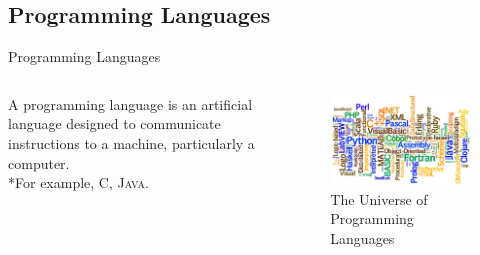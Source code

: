 \documentclass[hideothersubsections]{beamer}
\begin{document}
\subsection{Programming Languages}
\begin{frame}{Programming Languages}
\begin{columns}[T]
    \begin{column}{.4\textwidth}
     \begin{block}{}
A programming language is an artificial language designed to communicate instructions to a machine, particularly a computer.
\\*For example, \textsc{C, Java}.
    \end{block}
    \end{column}
    \begin{column}{.6\textwidth}
    \begin{block}{}
\begin{figure}[H]
    \includegraphics[width=1\textwidth]{progLanguages.jpg}
    
    \caption{The Universe of Programming Languages}
 \end{figure}   
    \end{block}
    \end{column}
  \end{columns}

\end{frame}
\end{document}
